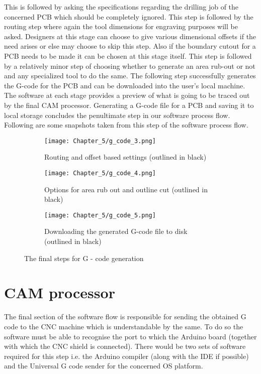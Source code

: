 This is followed by asking the specifications regarding the drilling job of the concerned PCB which should be completely ignored. This step is followed by the routing step where again the tool dimensions for engraving purposes will be asked. Designers at this stage can choose to give various dimensional offsets if the need arises or else may choose to skip this step. Also if the boundary cutout for a PCB needs to be made it can be chosen at this stage itself. This step is followed by a relatively minor step of choosing whether to generate an area rub-out or not and any specialized tool to do the same. The following step successfully generates the G-code for the PCB and can be downloaded into the user’s local machine. The software at each stage provides a preview of what is going to be traced out by the final CAM processor. Generating a G-code file for a PCB and saving it to local storage concludes the penultimate step in our software process flow. Following are some snapshots taken from this step of the software process flow. \par

\begin{figure}[h]
 \begin{subfigure}{0.5\textwidth}
  \texttt{[image: Chapter\_5/g\_code\_3.png]}
  \caption{Routing and offset based settings (outlined in black)}
  \label{fig:g3}
 \end{subfigure}
 \begin{subfigure}{0.5\textwidth}
  \texttt{[image: Chapter\_5/g\_code\_4.png]}
  \caption{Options for area rub out and outline cut (outlined in black)}
  \label{fig:g4}
 \end{subfigure}
 \begin{center}
  \begin{subfigure}{0.5\textwidth}
   \texttt{[image: Chapter\_5/g\_code\_5.png]}
   \caption{Downloading the generated G-code file to disk (outlined in black)}
   \label{fig:g5}
  \end{subfigure}
 \end{center}

 \caption{The final steps for G - code generation}
 \label{fig:g345}
\end{figure}

\section{CAM processor}

The final section of the software flow is responsible for sending the obtained G code to the CNC machine which is understandable by the same. To do so the software must be able to recognise the port to which the Arduino board (together with which the CNC shield is connected). There would be two sets of software required for this step i.e. the Arduino compiler (along with the IDE if possible) and the Universal G code sender for the concerned OS platform. \par

